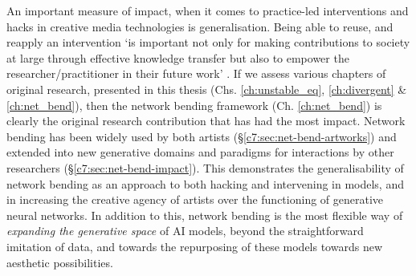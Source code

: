 An important measure of impact, when it comes to practice-led interventions and hacks in creative media technologies is generalisation.
Being able to reuse, and reapply an intervention `is important not only for making contributions to society at large through effective knowledge transfer but also to empower the researcher/practitioner in their future work' \citep{brown2009integrating}.
If we assess various chapters of original research, presented in this thesis (Chs. \ref{ch:unstable_eq}, \ref{ch:divergent} \& \ref{ch:net_bend}), then the network bending framework (Ch. \ref{ch:net_bend}) is clearly the original research contribution that has had the most impact. 
Network bending has been widely used by both artists (\S \ref{c7:sec:net-bend-artworks}) and extended into new generative domains and paradigms for interactions by other researchers (\S \ref{c7:sec:net-bend-impact}).
This demonstrates the generalisability of network bending as an approach to both hacking and intervening in models, and in increasing the creative agency of artists over the functioning of generative neural networks.
In addition to this, network bending is the most flexible way of \textit{expanding the generative space} of AI models, beyond the straightforward imitation of data, and towards the repurposing of these models towards new aesthetic
possibilities. 
